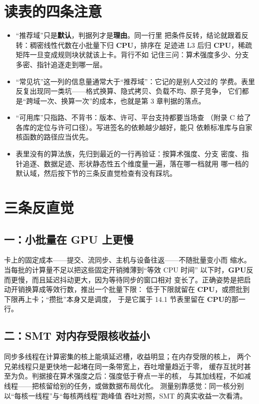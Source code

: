 \documentclass[12pt,a4paper,fontset=fandol]{ctexbook}
\newcommand{\Dom}[1]{\textsf{\bfseries #1}}
\newcommand{\CPU}{\Dom{CPU}}
\newcommand{\GPU}{\Dom{GPU}}
\begin{document}
\section{读表的四条注意}

\begin{itemize}
\item ``推荐域''只是\textbf{默认}，判据列才是\textbf{理由}。同一行里
把条件反转，结论就跟着反转：稠密线性代数在小批量下归 \CPU{}，排序在
足迹进 L3 后归 \CPU{}，稀疏矩阵一旦变成规则块状就该上卡。背行不如
记住三问：算术强度多少、分支多密、指针追逐走到哪一层。
\item ``常见坑''这一列的信息量通常大于``推荐域''：它记的是别人交过的
学费。表里反复出现同一类坑——格式换算、隐式拷贝、负载不均、原子竞争，
它们都是``跨域一次、换算一次''的成本，也就是第 3 章判据的落点。
\item ``可用库''只指路、不背书：版本、许可、平台支持都要当场查
（附录 C 给了各库的定位与许可口径）。写进签名的依赖越少越好，能只
依赖标准库与自家核函数的路径应当优先。
\item 表里没有的算法族，先归到最近的一行再验证：按算术强度、分支
密度、指针追逐、数据足迹、形状静态性五个维度量一遍，落在哪一档就用
哪一档的默认域，然后按下节的三条反直觉检查有没有踩坑。
\end{itemize}

\section{三条反直觉}

\subsection{一：小批量在 GPU 上更慢}

卡上的固定成本——提交、流同步、主机与设备往返——不随批量变小而
缩水。当每批的计算量不足以把这些固定开销摊薄到``等效 CPU 时间''
以下时，\GPU{}反而更慢，而且延迟抖动更大，因为等待同步的窗口相对
变长了。正确姿势是把启动开销换算成等效行数，推出一个批量下限：
低于下限就留在 \CPU{}，或攒批到下限再上卡；``攒批''本身又是调度，
于是它属于 14.1 节表里留在 \CPU{}的那一行。

\subsection{二：SMT 对内存受限核收益小}

同步多线程在计算密集的核上能填延迟槽，收益明显；在内存受限的核上，
两个兄弟线程只是更快地一起堵在同一条带宽上，吞吐增量趋近于零，
缓存互扰时甚至为负。判据接在算术强度之后：强度低于脊点一半的核，
与其加线程，不如减线程——把核留给别的任务，或做数据布局优化。
测量别靠感觉：同一核分别以``每核一线程''与``每核两线程''跑峰值
吞吐对照，SMT 的真实收益一次看清。
\end{document}
